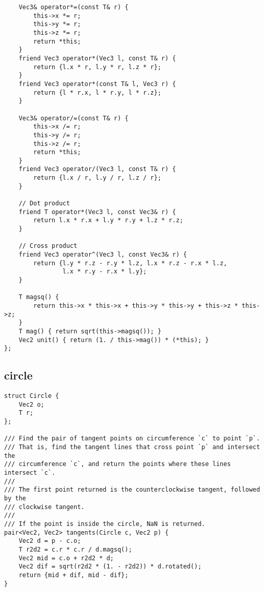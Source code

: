 \documentclass[twoside]{article}
\begin{document}
\begin{multicols*}{2}
\begin{verbatim}
    Vec3& operator*=(const T& r) {
        this->x *= r;
        this->y *= r;
        this->z *= r;
        return *this;
    }
    friend Vec3 operator*(Vec3 l, const T& r) {
        return {l.x * r, l.y * r, l.z * r};
    }
    friend Vec3 operator*(const T& l, Vec3 r) {
        return {l * r.x, l * r.y, l * r.z};
    }

    Vec3& operator/=(const T& r) {
        this->x /= r;
        this->y /= r;
        this->z /= r;
        return *this;
    }
    friend Vec3 operator/(Vec3 l, const T& r) {
        return {l.x / r, l.y / r, l.z / r};
    }

    // Dot product
    friend T operator*(Vec3 l, const Vec3& r) {
        return l.x * r.x + l.y * r.y + l.z * r.z;
    }

    // Cross product
    friend Vec3 operator^(Vec3 l, const Vec3& r) {
        return {l.y * r.z - r.y * l.z, l.x * r.z - r.x * l.z,
                l.x * r.y - r.x * l.y};
    }

    T magsq() {
        return this->x * this->x + this->y * this->y + this->z * this->z;
    }
    T mag() { return sqrt(this->magsq()); }
    Vec2 unit() { return (1. / this->mag()) * (*this); }
};
\end{verbatim}

{
\subsection*{circle}
}
\begin{verbatim}
struct Circle {
    Vec2 o;
    T r;
};

/// Find the pair of tangent points on circumference `c` to point `p`.
/// That is, find the tangent lines that cross point `p` and intersect the
/// circumference `c`, and return the points where these lines intersect `c`.
///
/// The first point returned is the counterclockwise tangent, followed by the
/// clockwise tangent.
///
/// If the point is inside the circle, NaN is returned.
pair<Vec2, Vec2> tangents(Circle c, Vec2 p) {
    Vec2 d = p - c.o;
    T r2d2 = c.r * c.r / d.magsq();
    Vec2 mid = c.o + r2d2 * d;
    Vec2 dif = sqrt(r2d2 * (1. - r2d2)) * d.rotated();
    return {mid + dif, mid - dif};
}
\end{verbatim}


\end{multicols*}
\end{document}
